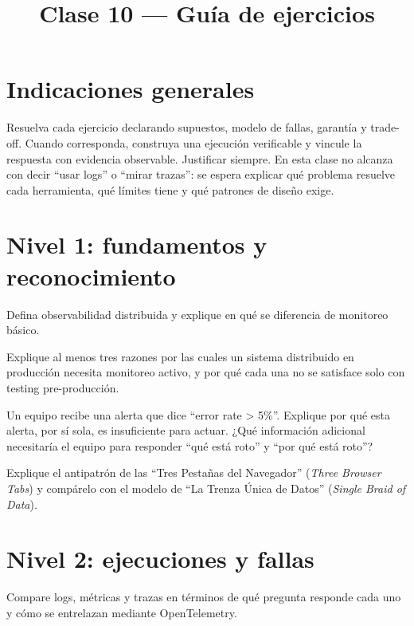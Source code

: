 \documentclass[variant=guia,cover=institutional,mode=screen]{ua-engineering-v6-article}
\title{Clase 10 --- Guía de ejercicios}
\author{\UAProfessor}
\date{\UADate}
\begin{document}
\section{Indicaciones generales}
Resuelva cada ejercicio declarando supuestos, modelo de fallas, garantía y trade-off. Cuando corresponda, construya una ejecución verificable y vincule la respuesta con evidencia observable. Justificar siempre. En esta clase no alcanza con decir “usar logs” o “mirar trazas”: se espera explicar qué problema resuelve cada herramienta, qué límites tiene y qué patrones de diseño exige.

\section{Nivel 1: fundamentos y reconocimiento}
\begin{uaexercise}
Defina observabilidad distribuida y explique en qué se diferencia de monitoreo básico.
\end{uaexercise}

\begin{uaexercise}
Explique al menos tres razones por las cuales un sistema distribuido en producción necesita monitoreo activo, y por qué cada una no se satisface solo con testing pre-producción.
\end{uaexercise}

\begin{uaexercise}
Un equipo recibe una alerta que dice ``error rate > 5\%''. Explique por qué esta alerta, por sí sola, es insuficiente para actuar. ¿Qué información adicional necesitaría el equipo para responder ``qué está roto'' y ``por qué está roto''?
\end{uaexercise}

\begin{uaexercise}
Explique el antipatrón de las ``Tres Pestañas del Navegador'' (\emph{Three Browser Tabs}) y compárelo con el modelo de ``La Trenza Única de Datos'' (\emph{Single Braid of Data}).
\end{uaexercise}

\section{Nivel 2: ejecuciones y fallas}
\begin{uaexercise}
Compare logs, métricas y trazas en términos de qué pregunta responde cada uno y cómo se entrelazan mediante OpenTelemetry.
\end{uaexercise}
\end{document}
